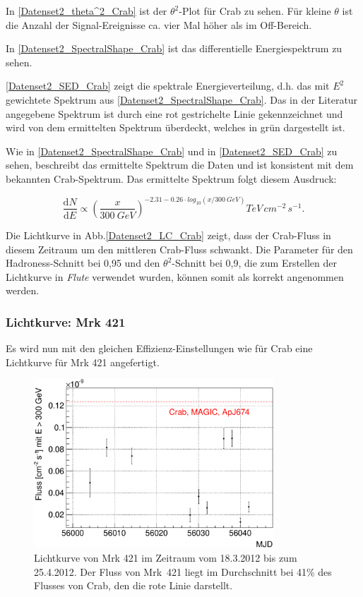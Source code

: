In \autoref{Datenset2_theta^2_Crab} ist der $\theta^2$-Plot für Crab zu sehen. Für kleine $\theta$ ist die Anzahl der Signal-Ereignisse ca. vier Mal höher als im Off-Bereich.

In \autoref{Datenset2_SpectralShape_Crab} ist das differentielle Energiespektrum zu sehen.

\autoref{Datenset2_SED_Crab} zeigt die spektrale Energieverteilung, d.h. das mit $E^2$ gewichtete Spektrum aus \autoref{Datenset2_SpectralShape_Crab}.
Das in der Literatur angegebene Spektrum ist durch eine rot gestrichelte Linie gekennzeichnet und wird von dem ermittelten Spektrum überdeckt, welches in grün dargestellt ist.

Wie in \autoref{Datenset2_SpectralShape_Crab} und in \autoref{Datenset2_SED_Crab} zu sehen, beschreibt das ermittelte Spektrum die Daten und ist konsistent mit dem bekannten Crab-Spektrum.
Das ermittelte Spektrum folgt diesem Ausdruck:

\begin{equation}
\frac{\mathrm{d}N}{\mathrm{d}E} \propto \left(\frac{x}{\SI{300}{GeV}}\right)^{-2.31-0.26\cdot log_{10}(x/\SI{300}{GeV})}\si{TeV\,cm^{-2}\,s^{-1}}.
\end{equation}

Die Lichtkurve in Abb.\ref{Datenset2_LC_Crab} zeigt, dass der Crab-Fluss in diesem Zeitraum um den mittleren Crab-Fluss schwankt.
Die Parameter für den Hadroness-Schnitt bei 0,95 und den $\theta^2$-Schnitt bei 0,9, die zum Erstellen der Lichtkurve in \textit{Flute} verwendet wurden, können somit als korrekt angenommen werden.

\subsubsection{Lichtkurve: Mrk 421}
Es wird nun mit den gleichen Effizienz-Einstellungen wie für Crab eine Lichtkurve für Mrk 421 angefertigt.

\begin{figure}
    \centering
    \includegraphics[width=0.8\textwidth]{./Plots/04_MrkAnalyse/Datenset2/LC_Mrk421.pdf}
    \caption{Lichtkurve von Mrk 421 im Zeitraum vom 18.3.2012 bis zum 25.4.2012.
    Der Fluss von Mrk~421 liegt im Durchschnitt bei 41\% des Flusses von Crab, den die rote Linie darstellt.}
    \label{Datenset2_LC_Mrk421}
\end{figure}

